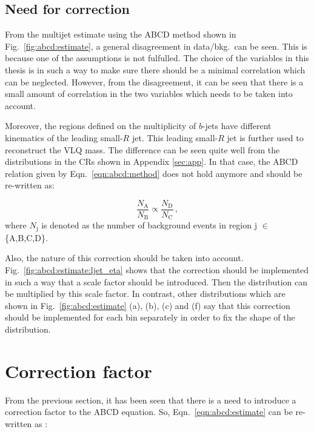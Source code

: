 \subsection{Need for correction}
\label{sec:abcd:estimate:need}
From the multijet estimate using the ABCD method shown in Fig.\ \ref{fig:abcd:estimate}, a general disagreement in data/bkg.\ can be seen. This is because one of the assumptions is not fulfulled. The choice of the variables in this thesis is in such a way to make sure there should be a minimal correlation which can be neglected. However, from the disagreement, it can be seen that there is a small amount of correlation in the two variables which needs to be taken into account. 

Moreover, the regions defined on the multiplicity of $b$-jets have different kinematics of the leading small-$R$ jet. This leading small-$R$ jet is further used to reconstruct the VLQ mass. The difference can be seen quite well from the distributions in the CRs shown in Appendix \ref{sec:app}. In that case, the ABCD relation given by Eqn.\ \ref{eqn:abcd:method} does not hold anymore and should be re-written as:

\begin{equation}
\frac{N_{\text{A}}}{N_{\text{B}}} \propto \frac{N_{\text{D}}}{N_{\text{C}}} \,,
\label{eqn:abcd:estimate:need}
\end{equation}
where $N_{\text{j}}$ is denoted as the number of background events in region j $\in$ \{A,B,C,D\}.

Also, the nature of this correction should be taken into account. Fig.\ \ref{fig:abcd:estimate:ljet_eta} shows that the correction should be implemented in such a way that a scale factor should be introduced. Then the distribution can be multiplied by this scale factor. In contrast, other distributions which are shown in Fig.\ \ref{fig:abcd:estimate} (a), (b), (c) and (f) say that this correction should be implemented for each bin separately in order to fix the shape of the distribution.


\section{Correction factor}
\label{sec:abcd:correctionfactor}
From the previous section, it has been seen that there is a need to introduce a correction factor to the ABCD equation. So, Eqn.\ \ref{eqn:abcd:estimate} can be re-written as :

